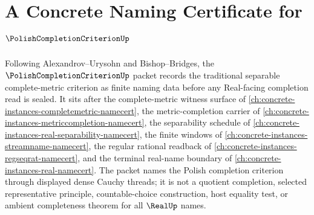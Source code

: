 \chapter{A Concrete Naming Certificate for $\PolishCompletionCriterionUp$}
\label{ch:concrete-instances-polish-completion-criterion-namecert}

Following Alexandrov--Urysohn and Bishop--Bridges, the $\PolishCompletionCriterionUp$ packet records the traditional separable complete-metric criterion as finite naming data before any Real-facing completion read is sealed. It sits after the complete-metric witness surface of \autoref{ch:concrete-instances-completemetric-namecert}, the metric-completion carrier of \autoref{ch:concrete-instances-metriccompletion-namecert}, the separability schedule of \autoref{ch:concrete-instances-real-separability-namecert}, the finite windows of \autoref{ch:concrete-instances-streamname-namecert}, the regular rational readback of \autoref{ch:concrete-instances-regseqrat-namecert}, and the terminal real-name boundary of \autoref{ch:concrete-instances-real-namecert}. The packet names the Polish completion criterion through displayed dense Cauchy threads; it is not a quotient completion, selected representative principle, countable-choice construction, host equality test, or ambient completeness theorem for all $\RealUp$ names.

